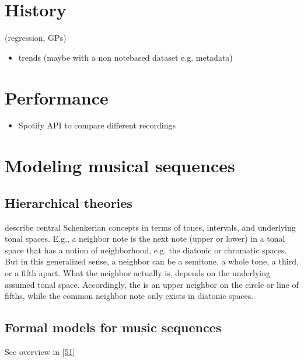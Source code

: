 \documentclass[letterpaper,10pt,english]{sphinxmanual}
\begin{document}
\section{History}
\label{\detokenize{6_advanced:history}}
\sphinxAtStartPar
(regression, GPs)
\begin{itemize}
\item {} 
\sphinxAtStartPar
trends (maybe with a non note\sphinxhyphen{}based dataset e.g. metadata)

\end{itemize}


\section{Performance}
\label{\detokenize{6_advanced:performance}}\begin{itemize}
\item {} 
\sphinxAtStartPar
Spotify API to compare different recordings

\end{itemize}


\section{Modeling musical sequences}
\label{\detokenize{6_advanced:modeling-musical-sequences}}

\subsection{Hierarchical theories}
\label{\detokenize{6_advanced:hierarchical-theories}}
\sphinxAtStartPar
describe central Schenkerian concepts in terms
of tones, intervals, and underlying tonal spaces.
E.g., a neighbor note is the next note (upper or lower)
in a tonal space that has a notion of neighborhood, e.g.
the diatonic or chromatic spaces. But in this generalized sense,
a neighbor can be a semitone, a whole tone, a third, or a fifth
apart. What the neighbor actually is, depends on the underlying
assumed tonal space. Accordingly, the  is an upper
neighbor on the circle or line of fifths, while the common neighbor note
only exists in diatonic spaces.


\subsection{Formal models for music sequences}
\label{\detokenize{6_advanced:formal-models-for-music-sequences}}
\sphinxAtStartPar
See overview in {[}\hyperlink{cite.8_bibliography:id17}{51}{]}
\end{document}
